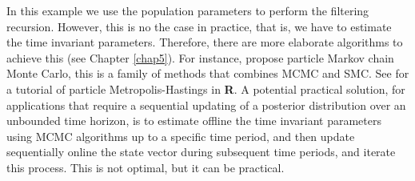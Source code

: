 In this example we use the population parameters to perform the filtering recursion. However, this is no the case in practice, that is, we have to estimate the time invariant parameters. Therefore, there are more elaborate algorithms to achieve this (see Chapter \ref{chap5}). For instance, \cite{andrieu2010pmcmc} propose particle Markov chain Monte Carlo, this is a family of methods that combines MCMC and SMC. See \cite{dahlin2019getting} for a tutorial of particle Metropolis-Hastings in \textbf{R}. A potential practical solution, for applications that require a sequential updating of a posterior distribution over an unbounded time horizon, is to estimate offline the time invariant parameters using MCMC algorithms up to a specific time period, and then update sequentially online the state vector during subsequent time periods, and iterate this process. This is not optimal, but it can be practical.  

